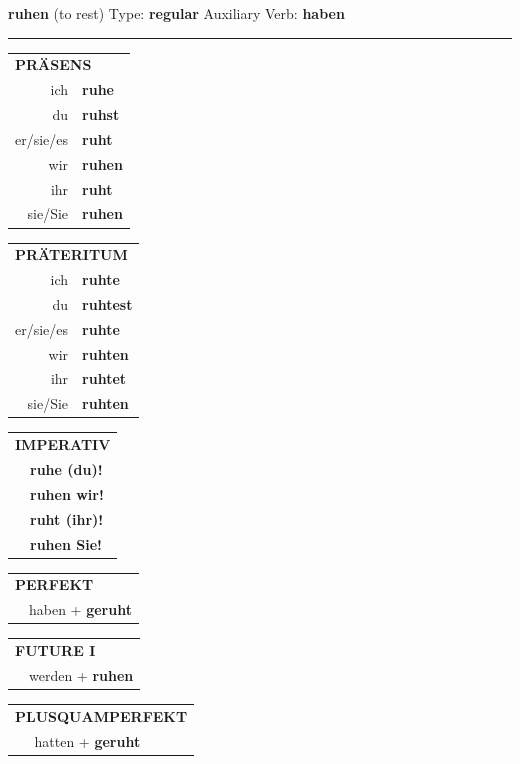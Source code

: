 \documentclass[10pt,a4paper]{revtex4-2}
\begin{document}
\begin{verbbox}
{\Large \bf ruhen} (to rest) \hfill Type: \textbf{regular} \hfill Auxiliary Verb: \textbf{haben} 

\vspace{5pt}
\hrule
\vspace{5pt}

\begin{tabular}{rl}
\multicolumn{2}{l}{\textbf{PRÄSENS}}\\
ich & \textbf{ruhe}\\
du & \textbf{ruhst}\\
er/sie/es & \textbf{ruht}\\
wir & \textbf{ruhen}\\
ihr & \textbf{ruht}\\
sie/Sie & \textbf{ruhen}\\
\end{tabular}
\hfill
\begin{tabular}{rl}
\multicolumn{2}{l}{\textbf{PRÄTERITUM}}\\
ich & \textbf{ruhte}\\
du & \textbf{ruhtest}\\
er/sie/es & \textbf{ruhte}\\
wir & \textbf{ruhten}\\
ihr & \textbf{ruhtet}\\
sie/Sie & \textbf{ruhten}\\
\end{tabular}
\hfill
\begin{tabular}{rl}
\multicolumn{2}{l}{\textbf{IMPERATIV}}\\
& \textbf{ruhe (du)!}\\
& \textbf{ruhen wir!}\\
& \textbf{ruht (ihr)!}\\
& \textbf{ruhen Sie!}\\
\end{tabular}

\vspace{10pt}

\begin{tabular}{rl}
\multicolumn{2}{l}{\textbf{PERFEKT}}\\
& haben + \textbf{geruht}\\
\end{tabular}
\hfill
\begin{tabular}{rl}
\multicolumn{2}{l}{\textbf{FUTURE I}}\\
& werden + \textbf{ruhen}\\
\end{tabular}
\hfill
\begin{tabular}{rl}
\multicolumn{2}{l}{\textbf{PLUSQUAMPERFEKT}}\\
& hatten + \textbf{geruht}\\
\end{tabular}


\end{verbbox}
\end{document}
